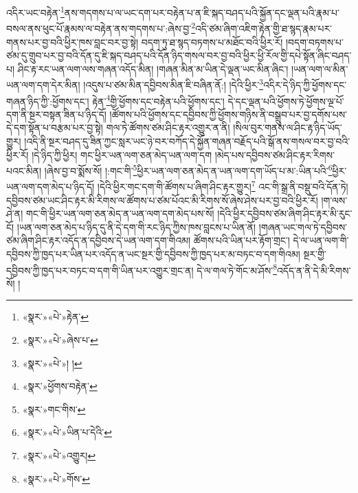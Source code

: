 འདིར་ཡང་བརྟེན་\footnote{«སྣར་»«པེ་»རྟེན་}ནས་གདགས་པ་ལ་ཡང་དག་པར་བརྟེན་པ་ན་ཇི་སྐད་བཤད་པའི་སྐྱོན་དང་ལྡན་པའི་རྣམ་པ་བསལ་ནས་ཕུང་པོ་རྣམས་ལ་བརྟེན་ནས་གདགས་པ་:ཞེས་བྱ་\footnote{«སྣར་»«པེ་»ཞེས་པ་}འདི་ཙམ་ཞིག་འཇིག་རྟེན་གྱི་ཐ་སྙད་རྣམ་པར་གནས་པར་བྱ་བའི་ཕྱིར་ཁས་བླང་བར་བྱ་སྟེ། བདག་ཏུ་ཐ་སྙད་བཏགས་པ་མཐོང་བའི་ཕྱིར་རོ། །བདག་བཏགས་པ་ཙམ་དུ་གྲུབ་པར་བྱ་བའི་དོན་དུ་ཇི་སྐད་བཤད་པའི་དོན་ཉིད་གསལ་བར་བྱ་བའི་ཕྱིར་ཕྱི་རོལ་གྱི་དཔེ་སྟོན་ཞིང་བཤད་པ། ཤིང་རྟ་རང་ཡན་ལག་ལས་གཞན་འདོད་མིན། །གཞན་མིན་མ་ཡིན་དེ་ལྡན་ཡང་མིན་ཞིང་། །ཡན་ལག་ལ་མིན་ཡན་ལག་དག་དེར་མིན། །འདུས་པ་ཙམ་མིན་དབྱིབས་མིན་ཇི་བཞིན་ནོ:། །དེའི་ཕྱིར་\footnote{«སྣར་»«པེ་»། །}འདིར་དེ་ཉིད་ཀྱི་ཕྱོགས་དང་གཞན་ཉིད་ཀྱི་:ཕྱོགས་དང་། རྟེན་\footnote{«སྣར་»ཕྱོགས་བརྟེན་}གྱི་ཕྱོགས་དང་བརྟེན་པའི་ཕྱོགས་དང་། དེ་དང་ལྡན་པའི་ཕྱོགས་ཏེ་ཕྱོགས་ལྔ་པོ་དག་ནི་སྔར་བསྟན་ཟིན་པ་ཉིད་དོ། །ཚོགས་པའི་ཕྱོགས་དང་དབྱིབས་ཀྱི་ཕྱོགས་གཉིས་ནི་བསྒྲུབ་པར་བྱ་དགོས་པས་དེ་དག་སྟོན་པ་བརྩམ་པར་བྱ་སྟེ། གལ་ཏེ་ཚོགས་ཙམ་ཤིང་རྟར་འགྱུར་ན་ནི། །སིལ་བུར་གནས་ལ་ཤིང་རྟ་ཉིད་ཡོད་གྱུར། །འདི་ནི་སྔར་བཤད་དུ་ཟིན་ཀྱང་སླར་ཡང་ཉེ་བར་བཀོད་དེ་སྐྱོན་གཞན་བརྗོད་པའི་སྒོ་ནས་གསལ་བར་བྱ་བའི་ཕྱིར་རོ། །དེ་ཉིད་ཀྱི་ཕྱིར། གང་ཕྱིར་ཡན་ལག་ཅན་མེད་ཡན་ལག་དག །མེད་པས་དབྱིབས་ཙམ་ཤིང་རྟར་རིགས་པའང་མིན། །ཞེས་བྱ་བ་སྨོས་སོ། །:གང་གི་\footnote{«སྣར་»གང་གིས་}ཕྱིར་ཡན་ལག་ཅན་མེད་ན་ཡན་ལག་དག་ཡོད་པ་མ་:ཡིན་པའི་\footnote{«སྣར་»«པེ་»ཡིན་པ་དེའི་}ཕྱིར་ཡན་ལག་དག་མེད་པ་ཉིད་དོ། །དེའི་ཕྱིར་གང་དག་གི་ཚོགས་པ་ཞིག་ཤིང་རྟར་གྱུར།\footnote{«སྣར་»«པེ་»འགྱུར།} འང་གི་སྒྲ་ནི་བསྡུ་བའི་དོན་ཏེ། དབྱིབས་ཙམ་ཡང་ཤིང་རྟར་མི་རིགས་ལ་ཚོགས་པ་ཙམ་པོའང་མི་རིགས་སོ་ཞེས་ཤེས་པར་བྱ་བའི་ཕྱིར་རོ། །ག་ལས་ཤེ་ན། གང་གི་ཕྱིར་ཡན་ལག་ཅན་མེད་ན་ཡན་ལག་དག་མེད་པས་སོ། །དེའི་ཕྱིར་དབྱིབས་ཙམ་ཞིག་ཤིང་རྟར་མི་རུང་ངོ། །ཡན་ལག་ཅན་མེད་པ་ཉིད་དུ་ནི་དེ་དག་གི་རང་ཉིད་ཀྱིས་ཁས་བླངས་པ་ཡིན་ནོ། །གཞན་ཡང་གལ་ཏེ་དབྱིབས་ཙམ་ཞིག་ཤིང་རྟར་འདོད་ན་དབྱིབས་དེ་ཡན་ལག་དག་གིའམ། ཚོགས་པའི་ཡིན་པར་རྟོག་གྲང་། དེ་ལ་ཡན་ལག་གི་དབྱིབས་ཀྱི་ཁྱད་པར་ཡིན་པར་འདོད་ན་ཡང་སྔར་གྱི་དབྱིབས་ཀྱི་ཁྱད་པར་མ་བཏང་བ་དག་གིའམ། སྔར་གྱི་དབྱིབས་ཀྱི་ཁྱད་པར་བཏང་བ་དག་གི་ཡིན་པར་འགྱུར་གྲང་ན། དེ་ལ་གལ་ཏེ་གོང་མ་ཤོས་\footnote{«སྣར་»«པེ་»གོས་}འདོད་ན་ནི་དེ་མི་རིགས་སོ། །
